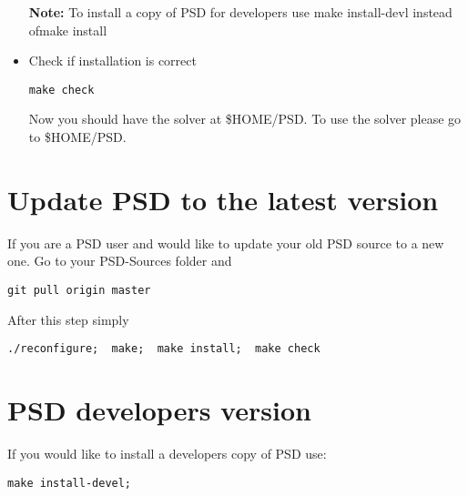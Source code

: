 \begin{itemize}
\textbf{Note:} To install a copy of PSD for developers use {\ttfamily make install-devl} instead of{\ttfamily make install} 


\item Check if installation is correct 
\begin{lstlisting}[style=Linux]
make check
\end{lstlisting}

Now you should have the solver at {\ttfamily \$HOME/PSD}. To use the solver please go to {\ttfamily \$HOME/PSD}.

\end{itemize}

\section{Update PSD to the latest version}

If you are a PSD user and would like to update your old PSD source to a new one. Go to your {\ttfamily PSD-Sources} folder and

\begin{lstlisting}[style=Linux]
git pull origin master
\end{lstlisting}

After this step simply

\begin{lstlisting}[style=Linux]
./reconfigure;  make;  make install;  make check
\end{lstlisting}

\section{PSD developers version}

If you would like to install  a developers copy  of PSD use:

\begin{lstlisting}[style=Linux]
make install-devel;
\end{lstlisting}
